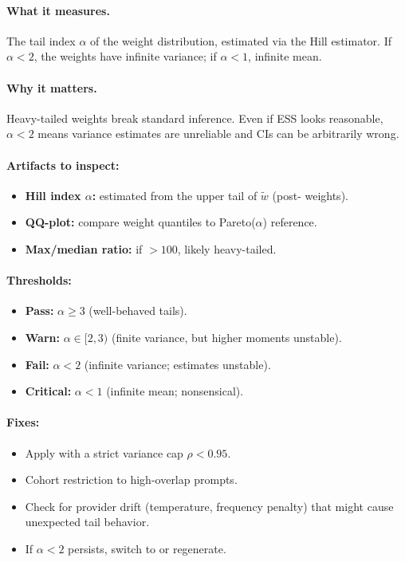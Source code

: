 \begin{enumerate}[resume]
\paragraph{What it measures.} The tail index $\alpha$ of the weight distribution, estimated via the Hill estimator. If $\alpha < 2$, the weights have infinite variance; if $\alpha < 1$, infinite mean.

\paragraph{Why it matters.} Heavy-tailed weights break standard inference. Even if ESS looks reasonable, $\alpha < 2$ means variance estimates are unreliable and CIs can be arbitrarily wrong.

\paragraph{Artifacts to inspect:}
\begin{itemize}
\item \textbf{Hill index $\alpha$:} estimated from the upper tail of $\tilde{w}$ (post-\simcal{} weights).
\item \textbf{QQ-plot:} compare weight quantiles to Pareto($\alpha$) reference.
\item \textbf{Max/median ratio:} if $> 100$, likely heavy-tailed.
\end{itemize}

\paragraph{Thresholds:}
\begin{itemize}
\item \textbf{Pass:} $\alpha \ge 3$ (well-behaved tails).
\item \textbf{Warn:} $\alpha \in [2, 3)$ (finite variance, but higher moments unstable).
\item \textbf{Fail:} $\alpha < 2$ (infinite variance; estimates unstable).
\item \textbf{Critical:} $\alpha < 1$ (infinite mean; nonsensical).
\end{itemize}

\paragraph{Fixes:}
\begin{itemize}
\item Apply \simcal{} with a strict variance cap $\rho < 0.95$.
\item Cohort restriction to high-overlap prompts.
\item Check for provider drift (temperature, frequency penalty) that might cause unexpected tail behavior.
\item If $\alpha < 2$ persists, switch to \dr{} or regenerate.
\end{itemize}


\end{enumerate}

